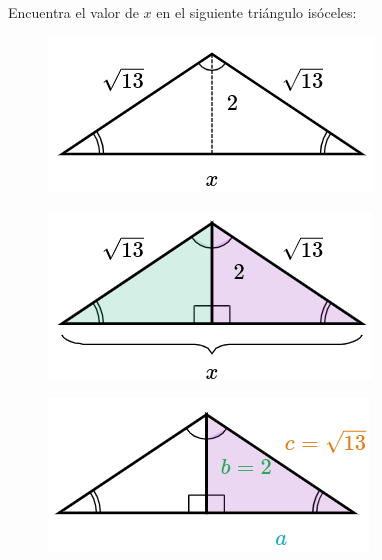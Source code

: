 Encuentra el valor de $x$ en el siguiente triángulo isóceles:

\begin{figure}[H]
    \centering
    \includegraphics[width=0.3\linewidth]{../images/pitagoras10.png}
    \caption{}
    \label{fig:pitagoras10}
\end{figure}
\begin{solutionbox}{15cm}
    \begin{minipage}{0.2\textwidth}
        \begin{figure}[H]
            \centering
            \includegraphics[width=0.9\linewidth]{../images/pitagoras10a.png}
            \caption{}
            \label{fig:pitagoras10a}
        \end{figure}
        \begin{figure}[H]
            \centering
            \includegraphics[width=0.9\linewidth]{../images/pitagoras10b.png}
            \caption{}

\end{figure}
\end{minipage}
\end{solutionbox}
